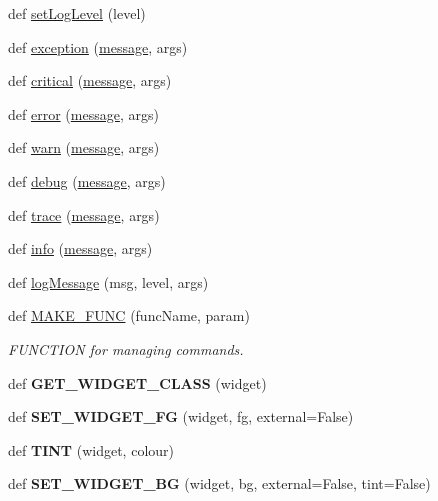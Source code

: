 \begin{DoxyCompactItemize}
def \hyperlink{classappjar_1_1gui_abcb23d31c09c0f65e7464f154fae31db}{set\+Log\+Level} (level)
\item 
def \hyperlink{classappjar_1_1gui_a7b8b2678ee341f64bfcbf2b7b018094f}{exception} (\hyperlink{classappjar_1_1gui_ad6a86c8206b7949e6726fdc8543d1957}{message}, args)
\item 
def \hyperlink{classappjar_1_1gui_abfda3f17e34765b0202b6dc709eb1b28}{critical} (\hyperlink{classappjar_1_1gui_ad6a86c8206b7949e6726fdc8543d1957}{message}, args)
\item 
def \hyperlink{classappjar_1_1gui_ac310868eecf500d1570400b396793b87}{error} (\hyperlink{classappjar_1_1gui_ad6a86c8206b7949e6726fdc8543d1957}{message}, args)
\item 
def \hyperlink{classappjar_1_1gui_a3ab0139430263b1913b4078cf34e7098}{warn} (\hyperlink{classappjar_1_1gui_ad6a86c8206b7949e6726fdc8543d1957}{message}, args)
\item 
def \hyperlink{classappjar_1_1gui_a4fff60acabbcc4f8c2e44d546d5f332b}{debug} (\hyperlink{classappjar_1_1gui_ad6a86c8206b7949e6726fdc8543d1957}{message}, args)
\item 
def \hyperlink{classappjar_1_1gui_ad70fee01cb2dbb2f5daef089c7e33884}{trace} (\hyperlink{classappjar_1_1gui_ad6a86c8206b7949e6726fdc8543d1957}{message}, args)
\item 
def \hyperlink{classappjar_1_1gui_ab6be724ff9fd035b9af554a06b4fffb0}{info} (\hyperlink{classappjar_1_1gui_ad6a86c8206b7949e6726fdc8543d1957}{message}, args)
\item 
def \hyperlink{classappjar_1_1gui_a34ac33d28f24372e8aa175baa7907acb}{log\+Message} (msg, level, args)
\item 
def \hyperlink{classappjar_1_1gui_a42aaf376a6c07c842b1b498948a9691a}{M\+A\+K\+E\+\_\+\+F\+U\+NC} (func\+Name, param)
\begin{DoxyCompactList}\small\item\em F\+U\+N\+C\+T\+I\+ON for managing commands. \end{DoxyCompactList}\item 
\mbox{\label{classappjar_1_1gui_a63c34ade6c112d1a900e8daf7bd96cfb}} 
def {\bfseries G\+E\+T\+\_\+\+W\+I\+D\+G\+E\+T\+\_\+\+C\+L\+A\+SS} (widget)
\item 
\mbox{\label{classappjar_1_1gui_a872f89e960d24e69d00f1ef4a8e2bc37}} 
def {\bfseries S\+E\+T\+\_\+\+W\+I\+D\+G\+E\+T\+\_\+\+FG} (widget, fg, external=False)
\item 
\mbox{\label{classappjar_1_1gui_a4205d1f2de65b344171cc42abe07fc19}} 
def {\bfseries T\+I\+NT} (widget, colour)
\item 
\mbox{\label{classappjar_1_1gui_abaeb0f2f9455190701aa392874ca7f35}} 
def {\bfseries S\+E\+T\+\_\+\+W\+I\+D\+G\+E\+T\+\_\+\+BG} (widget, bg, external=False, tint=False)
\end{DoxyCompactItemize}
